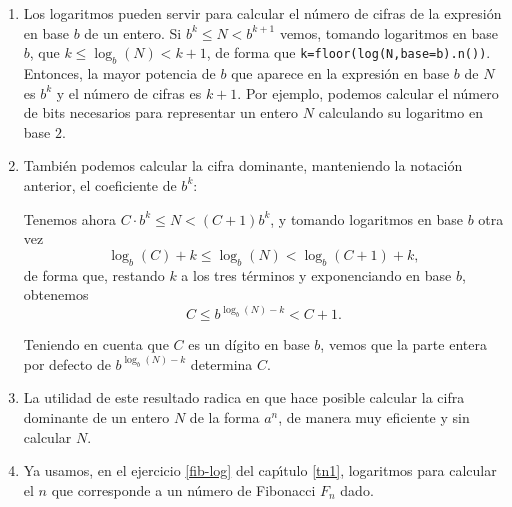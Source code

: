 \begin{enumerate}
 \item Los logaritmos pueden servir para calcular el n\'umero de cifras de la
expresi\'on en base $b$ de un entero. Si 
 $b^k\le N<b^{k+1}$ vemos, tomando logaritmos en base $b$, que $k \le \log_b(N)
<
k+1$, de forma que \lstinline|k=floor(log(N,base=b).n())|. Entonces, la mayor
potencia de $b$ que aparece en la expresi\'on en base $b$ de $N$ es $b^k$ y el
n\'umero de cifras es $k+1$. Por ejemplo, podemos calcular el n\'umero de bits
necesarios para representar un entero $N$ calculando su logaritmo en base $2$.

 \item Tambi\'en podemos calcular la cifra dominante, manteniendo la notaci\'on
anterior, el coeficiente de $b^k$: 

Tenemos ahora $C\cdot b^k\le N<(C+1)b^k$, y tomando logaritmos en base $b$ otra
vez 
\[\log_b(C)+k\le \log_b(N)< \log_b(C+1)+k,\]
\noindent de forma que, restando $k$ a los tres t\'erminos y exponenciando en
base $b$, obtenemos
\[C\le b^{\log_b(N)-k}<C+1.\]

Teniendo en cuenta que $C$ es un d\'{i}gito en base $b$, 
vemos que la parte entera por defecto de  $b^{\log_b(N)-k}$ determina $C$.
 \item La utilidad de este resultado radica en que hace posible calcular la cifra dominante de un entero $N$ de la forma $a^ n$, de manera muy eficiente y  sin calcular $N$. 
 \item Ya usamos, en el ejercicio \ref{fib-log} del cap\'{\i}tulo \ref{tn1},
logaritmos para calcular el $n$ que corresponde a un n\'umero de Fibonacci $F_n$
dado.
 
\end{enumerate}


